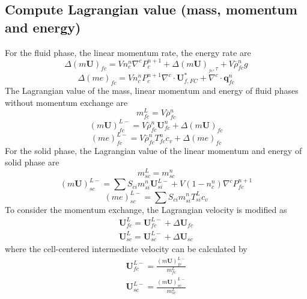 \documentclass[preprint,12pt]{elsarticle}
\begin{document}
\subsection{\textsf{Compute Lagrangian value (mass, momentum and energy)}}
For the fluid phase, the linear momentum rate, the energy rate are
\begin{equation}
 \Delta (m \pmb{U})_{fc} = V n_c^n \nabla^c P_{c}^{n+1} +\Delta (m \pmb{U})_{_{fc},\tau} + V \overline{\rho}_{fc}^n g
\end {equation}
%
%
\begin{equation}
 \Delta (me)_{fc} = V n_c^n P_{c}^{n+1} \nabla^c \cdot \pmb{U}_{f,FC}^{*} + \nabla^c \cdot \pmb{q}_{fc}^n
\end {equation}
%
%
The Lagrangian value of the mass, linear momentum and energy of fluid phases without momentum exchange are
%
%
\begin{equation}
 m_{fc}^L = V \overline{\rho}_{fc}^n 
\end {equation}
%
%
\begin{equation}
 (m \pmb{U})_{fc}^{L-} = V \overline{\rho}_{fc}^n \pmb{U}_{fc}^n + \Delta (m \pmb{U})_{fc} 
\end {equation}
%
%
\begin{equation}
 (me)_{fc}^{L-} = V \overline{\rho}_{fc}^n T_{fc}^n    c_v + \Delta (me)_{fc} 
\end {equation}
%
%
For the solid phase, the Lagrangian value of the linear momentum and energy of solid phase are
%
\begin{equation}
 m_{sc}^L = m_{sc}^n
\end {equation}
%
\begin{equation}
 (m \pmb{U})_{sc}^{L-} = \sum{S_{ci} m_{si}^n \pmb{U}_{si}^{L-}} + V (1-n_c^n) \nabla^c P_{fc}^{n+1}
\end {equation}
%
\begin{equation}
 (me)_{sc}^{L-} =  \sum{S_{ci} m_{si}^n T_{si}^L} c_v
\end {equation}
%
%
To consider the momentum exchange, the Lagrangian velocity is modified as
%
\begin{equation}
\begin{gathered}
\pmb{U}_{fc}^{L} = \pmb{U}_{fc}^{L-} + \Delta \pmb{U}_{fc} \\
\pmb{U}_{sc}^{L} = \pmb{U}_{sc}^{L-} + \Delta \pmb{U}_{sc}
\end {gathered}
\end {equation}
%
%
where the cell-centered intermediate velocity can be calculated by
%
\begin{equation}
\begin{gathered}
\pmb{U}_{fc}^{L-} = \frac{(m \pmb{U})_{fc}^{L-}}{m_{fc}^L} \\
\pmb{U}_{sc}^{L-} = \frac{(m \pmb{U})_{sc}^{L-}}{m_{sc}^L} 
\end {gathered}
\end {equation}
\end{document}
